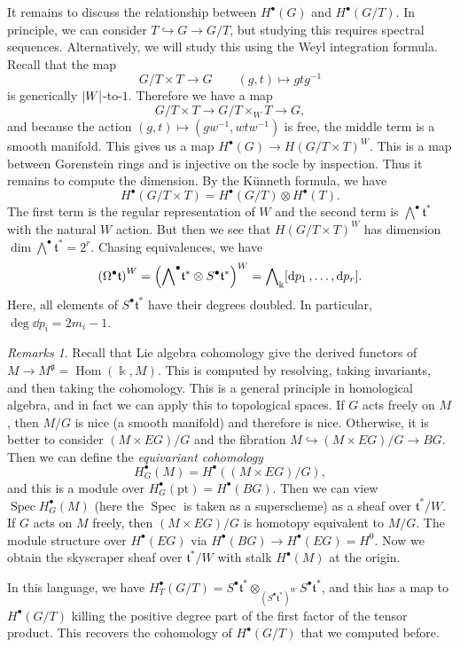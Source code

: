 \documentclass[leqno, openany]{memoir}
\theoremstyle{definition}
\theoremstyle{remark}
\newtheorem{rmks}[thm]{Remarks}
\theoremstyle{plain}
\theoremstyle{definition}
\theoremstyle{remark}
\renewcommand{\k}{\Bbbk}
\newcommand{\mf}[1]{\mathfrak{#1}}
\newcommand{\mr}[1]{\mathrm{#1}}
\DeclareMathOperator{\Hom}{Hom}
\DeclareMathOperator{\Spec}{Spec}
\begin{document}
It remains to discuss the relationship between $H^{\bullet}(G)$ and
$H^{\bullet}(G/T)$. In principle, we can consider $T \hookrightarrow G \to
G/T$, but studying this requires spectral sequences. Alternatively, we will
study this using the Weyl integration formula. Recall that the map \[ G/T
\times T \to G \qquad (g,t) \mapsto gtg^{-1} \] is generically
$\abs{W}$-to-$1$. Therefore we have a map \[ G/T \times T \to G/T \times_W T
\to G, \] and because the action $(g,t) \mapsto (gw^{-1}, wtw^{-1})$ is free,
the middle term is a smooth manifold. This gives us a map $H^{\bullet}(G) \to
{H(G/T \times T)}^W$. This is a map between Gorenstein rings and is injective
on the socle by inspection. Thus it remains to compute the dimension. By the
K\"unneth formula, we have \[ H^{\bullet}(G/T \times T) = H^{\bullet}(G/T)
\otimes H^{\bullet}(T). \] The first term is the regular representation of $W$
and the second term is $\bigwedge^{\bullet} \mf{t}^*$ with the natural $W$
action. But then we see that ${ H(G/T \times T) }^W$ has dimension $\dim
\bigwedge^{\bullet} \mf{t}^* = 2^r$. Chasing equivalences, we have \[
{(\Omega^{\bullet} \mf{t})}^W = {\qty({\bigwedge}^{\bullet} \mf{t}^* \otimes
S^{\bullet} \mf{t}^*)}^W = {\bigwedge}_{\k} [\dd{p_1}, \ldots, \dd{p_r}]. \]
Here, all elements of $S^{\bullet} \mf{t}^*$ have their degrees doubled. In
particular, $\deg \dd{p_i} = 2 m_i - 1$.

\begin{rmks} Recall that Lie algebra cohomology give the derived functors of $M
    \to M^{\mf{g}} = \Hom(\k, M)$. This is computed by resolving, taking
    invariants, and then taking the cohomology. This is a general principle in
    homological algebra, and in fact we can apply this to topological spaces.
    If $G$ acts freely on $M$, then $M/G$ is nice (a smooth manifold) and
    therefore is nice. Otherwise, it is better to consider $(M \times EG)/G$
    and the fibration $M \hookrightarrow (M \times EG)/G \to BG$. Then we can
    define the \textit{equivariant cohomology} \[ H^{\bullet}_G(M) =
    H^{\bullet}((M \times EG)/G), \] and this is a module over
    $H_G^{\bullet}(\mr{pt}) = H^{\bullet}(BG)$. Then we can view $\Spec
    H_G^{\bullet}(M)$ (here the $\Spec$ is taken as a superscheme) as a sheaf
    over $\mf{t}^*/W$. If $G$ acts on $M$ freely, then $(M \times EG)/G$ is
    homotopy equivalent to $M/G$. The module structure over $H^{\bullet}(EG)$
    via $H^{\bullet}(BG) \to H^{\bullet}(EG) = H^0$. Now we obtain the
    skyscraper sheaf over $\mf{t}^*/W$ with stalk $H^{\bullet}(M)$ at the
    origin.

    In this language, we have $H_T^{\bullet}(G/T) = S^{\bullet} \mf{t}^*
\otimes_{{(S^{\bullet} \mf{t}^*)}^W} S^{\bullet} \mf{t}^*$, and this has a map
to $H^{\bullet}(G/T)$ killing the positive degree part of the first factor of
the tensor product. This recovers the cohomology of $H^{\bullet}(G/T)$ that we
computed before.  \end{rmks}
\end{document}
